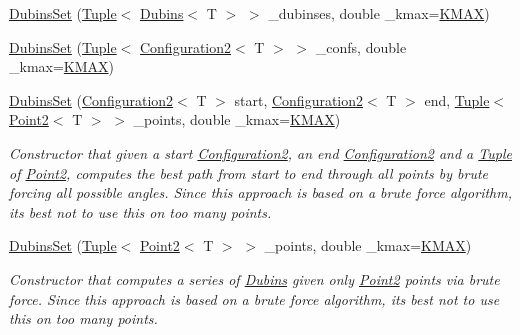 \begin{DoxyCompactItemize}
\item 
\mbox{\hyperlink{class_dubins_set_a36295af30ddae6a33bb6a8e35aee7eb1}{Dubins\+Set}} (\mbox{\hyperlink{class_tuple}{Tuple}}$<$ \mbox{\hyperlink{class_dubins}{Dubins}}$<$ T $>$ $>$ \+\_\+dubinses, double \+\_\+kmax=\mbox{\hyperlink{dubins_8hh_a940b85a83458e94519f2685b33ddd276}{K\+M\+AX}})
\item 
\mbox{\hyperlink{class_dubins_set_a60ae5e28b776ad39e965d4019e448d94}{Dubins\+Set}} (\mbox{\hyperlink{class_tuple}{Tuple}}$<$ \mbox{\hyperlink{class_configuration2}{Configuration2}}$<$ T $>$ $>$ \+\_\+confs, double \+\_\+kmax=\mbox{\hyperlink{dubins_8hh_a940b85a83458e94519f2685b33ddd276}{K\+M\+AX}})
\item 
\mbox{\hyperlink{class_dubins_set_a209e9ffddb76419c3ac103afb73b2b10}{Dubins\+Set}} (\mbox{\hyperlink{class_configuration2}{Configuration2}}$<$ T $>$ start, \mbox{\hyperlink{class_configuration2}{Configuration2}}$<$ T $>$ end, \mbox{\hyperlink{class_tuple}{Tuple}}$<$ \mbox{\hyperlink{class_point2}{Point2}}$<$ T $>$ $>$ \+\_\+points, double \+\_\+kmax=\mbox{\hyperlink{dubins_8hh_a940b85a83458e94519f2685b33ddd276}{K\+M\+AX}})
\begin{DoxyCompactList}\small\item\em Constructor that given a start {\ttfamily \mbox{\hyperlink{class_configuration2}{Configuration2}}}, an end {\ttfamily \mbox{\hyperlink{class_configuration2}{Configuration2}}} and a {\ttfamily \mbox{\hyperlink{class_tuple}{Tuple}}} of {\ttfamily \mbox{\hyperlink{class_point2}{Point2}}}, computes the best path from start to end through all points by brute forcing all possible angles. Since this approach is based on a brute force algorithm, it\textquotesingle{}s best not to use this on too many points. \end{DoxyCompactList}\item 
\mbox{\hyperlink{class_dubins_set_a4a85ce188aeabebf88509c2f60ceff31}{Dubins\+Set}} (\mbox{\hyperlink{class_tuple}{Tuple}}$<$ \mbox{\hyperlink{class_point2}{Point2}}$<$ T $>$ $>$ \+\_\+points, double \+\_\+kmax=\mbox{\hyperlink{dubins_8hh_a940b85a83458e94519f2685b33ddd276}{K\+M\+AX}})
\begin{DoxyCompactList}\small\item\em Constructor that computes a series of {\ttfamily \mbox{\hyperlink{class_dubins}{Dubins}}} given only {\ttfamily \mbox{\hyperlink{class_point2}{Point2}}} points via brute force. Since this approach is based on a brute force algorithm, it\textquotesingle{}s best not to use this on too many points. \end{DoxyCompactList}\item 

\end{DoxyCompactItemize}
